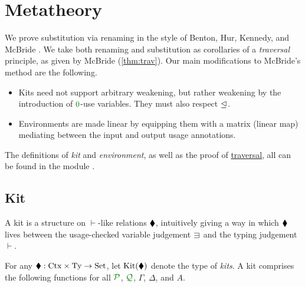 \documentclass[submission,copyright,creativecommons]{eptcs}
\begin{document}
\section{Metatheory}\label{sec:metatheory}

We prove substitution via renaming in the style of Benton, Hur, Kennedy, and
McBride \cite{bhkm12}.
We take both renaming and substitution as corollaries of a \emph{traversal}
principle, as given by McBride \cite{rensub05} (\autoref{thm:trav}).
Our main modifications to McBride's method are the following.
\begin{itemize}
  \item Kits need not support arbitrary weakening, but rather weakening by the
    introduction of $\rescomment 0$-use variables.
    They must also respect $\trianglelefteq$.
  \item Environments are made linear by equipping them with a matrix (linear
    map) mediating between the input and output usage annotations.
\end{itemize}

The definitions of \emph{kit} and \emph{environment}, as well as the proof of
\hyperref[thm:trav]{traversal}, all can be found in the module
.

\subsection{Kit}

A kit is a structure on $\vdash$-like relations $\mathbin{\blacklozenge}$, intuitively
giving a way in which $\mathbin{\blacklozenge}$ lives between the usage-checked variable
judgement $\lvar$ and the typing judgement $\vdash$.

\begin{definition}\label{def:kit}
  For any $\mathbin{\blacklozenge} : \mathrm{Ctx} \times \mathrm{Ty} \to \mathrm{Set}$, let
  $\operatorname{Kit}(\mathbin{\blacklozenge})$ denote the type of \emph{kits}.
  A kit comprises the following functions for all $\resctx P$, $\resctx Q$,
  $\Gamma$, $\Delta$, and $A$.

\end{definition}
\end{document}
